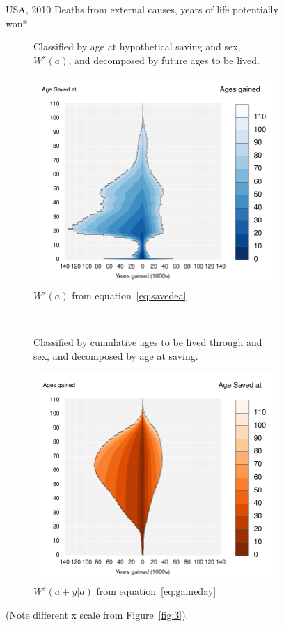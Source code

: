 \documentclass{article}
\begin{document}
\begin{figure}
\centering
\caption{USA, 2010 Deaths from external causes, years of life potentially won*}
\label{fig:4}
\begin{subfigure}[b]{.48\linewidth}
\centering
	\caption{Classified by age at hypothetical saving and sex, $W^s(a)$, and
	decomposed by future ages to be lived.}
	\label{fig:SavedGainedUSAExternal}
	\includegraphics[scale=.55]{Figures/YearsSavedGainedxx10USAExternal.pdf}
	\caption*{$W^s(a)$ from equation~\ref{eq:savedea}}	
\end{subfigure}
~
\begin{subfigure}[b]{.48\linewidth}
\centering
    \caption{Classified by cumulative ages to be lived through and sex, and
    decomposed by age at saving.}
	\label{fig:LostLivedUSAExternal}
    \includegraphics[scale=.55]{Figures/YearsLostLivedyx10USAExternal.pdf}
    \caption*{$W^s(a+y|a)$ from equation~\ref{eq:gaineday}}	
\end{subfigure}
\caption*{(Note different x scale from Figure~\ref{fig:3}).}
\end{figure}
\end{document}
